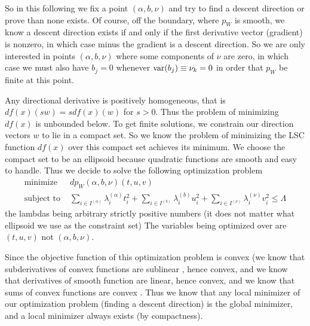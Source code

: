 So in this following we fix a point $(\alpha, b, \nu)$ and try to find
a descent direction or prove than none exists.  Of course, off the boundary,
where $p_W$ is smooth, we know a descent direction exists if and only if
the first derivative vector (gradient) is nonzero, in which case minus
the gradient is a descent direction.  So we are only interested in points
$(\alpha, b, \nu)$ where some components of $\nu$ are zero, in which case
we must also have $b_j = 0$ whenever $\operatorname{var}(b_j) \equiv \nu_k = 0$
in order that $p_W$ be finite at this point.

Any directional derivative is positively homogeneous, that is
$d f(x)(s w) = s d f(x)(w)$ for $s > 0$.  Thus the problem of minimizing
$d f(x)$ is unbounded below.  To get finite solutions, we constrain our
direction vectors $w$ to lie in a compact set.  So we know the problem
of minimizing the LSC function $d f(x)$ over this compact set achieves its
minimum.  We choose the compact set to be an ellipsoid because quadratic
functions are smooth and easy to handle.  Thus we decide to solve the following
optimization problem
\begin{subequations}
\begin{align}
   \text{minimize } & d p_W(\alpha, b, \nu)(t, u, v)
   \label{eq:problem-objfun}
   \\
   \text{subject to } &
   \sum_{i \in I^{(\alpha)}} \lambda^{(\alpha)}_i t_i^2
   + \sum_{i \in I^{(b)}} \lambda^{(b)}_i u_i^2
   + \sum_{i \in I^{(\nu)}} \lambda^{(\nu)}_i v_i^2
   \le \Lambda
   \label{eq:problem-consfun}
\end{align}
\end{subequations}
the lambdas being arbitrary strictly positive numbers
(it does not matter what ellipsoid we use as the constraint set)
The variables being optimized over are $(t, u, v)$ not $(\alpha, b, \nu)$.

Since the objective function of this optimization problem is convex
(we know that subderivatives of convex functions are sublinear
\citep[Proposition~8.21]{rockafellar-wets}, hence convex,
and we know that derivatives of smooth function are linear, hence convex,
and we know that sums of convex functions are convex
\citep[Exercise~2.18]{rockafellar-wets}.  Thus we know that any local minimizer
of our optimization problem (finding a descent direction) is the global
minimizer, and a local minimizer always exists (by compactness).

